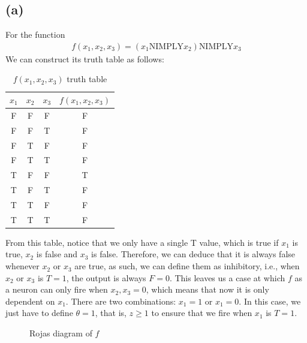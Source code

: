 \documentclass[a4paper]{article}
\theoremstyle{plain}
\theoremstyle{definition}
\theoremstyle{remark}
\begin{document}
	\subsection{(a)}
	For the function
	\begin{align*}
		f(x_1,x_2,x_3) = (x_1 \text{NIMPLY}x_2) \text{NIMPLY} x_3
	\end{align*}
	We can construct its truth table as follows:
	\begin{table}[H]
		\centering
		\caption{$f(x_1,x_2,x_3)$ truth table}
		\label{tab:f}
		\begin{tabular}{|c|c|c|c|}
			\hline
		$x_1$ & $x_2$ &$x_3$  & $f(x_1,x_2,x_3)$ \\
		\hline
		F & F & F & F \\
		F & F & T & F \\
		F & T & F & F \\
		F & T & T & F \\
		T & F & F & T \\
		T & F & T & F \\
		T & T & F & F \\
		T & T & T & F \\
		\hline
		\end{tabular}
	\end{table}
\noindent From this table, notice that we only have a single T value, which is true if $x_1$ is true, $x_2$ is false and $x_3$ is false. Therefore, we can deduce that it is always false whenever $x_2$ or $x_3$ are true, as such, we can define them as inhibitory, i.e., when $x_2$ or $x_3$ is $T=1$, the output is always $F=0$. This leaves us a case at which $f$ as a neuron can only fire when $x_2,x_3=0$, which means that now it is only dependent on $x_1$. There are two combinations: $x_1 = 1$ or $x_1=0$. In this  case, we just have to define $\theta = 1$, that is, $z \ge 1$ to ensure that we fire when $x_1$ is $T=1$.	
\begin{figure}[H]
	\centering
	\caption{Rojas diagram of $f$}
	\label{fig:rojas}
\end{figure}
\end{document}
